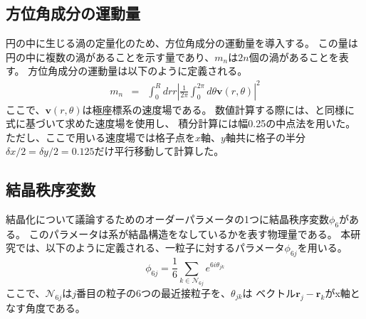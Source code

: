 \documentclass[/Users/ikedahajime/GitHub/reserch/master_report/thesis]{subfiles}
\begin{document}
\subsection{方位角成分の運動量}
円の中に生じる渦の定量化のため、方位角成分の運動量を導入する\cite{nishiguchiVortexReversalPrecursor2024}。
この量は円の中に複数の渦があることを示す量であり、$m_n$は$2n$個の渦があることを表す。
方位角成分の運動量は以下のように定義される。
\begin{eqnarray}
    m_n &=& \int_0^R dr r\left|\frac{1}{2\pi}\int_0^{2\pi}d\theta \bm{v}(r,\theta)\right|^2
\end{eqnarray}
ここで、$\bm{v}(r,\theta)$は極座標系の速度場である。
数値計算する際には、と同様に式に基づいて求めた速度場を使用し、
積分計算には幅0.25の中点法を用いた。
ただし、ここで用いる速度場では格子点を$x$軸、$y$軸共に格子の半分$\delta x/2=\delta y/2=0.125$だけ平行移動して計算した。

\subsection{結晶秩序変数}
結晶化について議論するためのオーダーパラメータの1つに結晶秩序変数$\phi_6$がある。
このパラメータは系が結晶構造をなしているかを表す物理量である。
本研究では、以下のように定義される、一粒子に対するパラメータ$\phi_{6j}$を用いる。
\begin{equation}
    \phi_{6j}=\frac{1}{6}\sum_{k\in \mathcal{N}_{6j}} e^{6i\theta_{jk}}
\end{equation}
ここで、$\mathcal{N}_{6j}$は$j$番目の粒子の6つの最近接粒子を、$\theta_{jk}$は
ベクトル$\bm{r}_j-\bm{r}_k$がx軸となす角度である。
\end{document}
